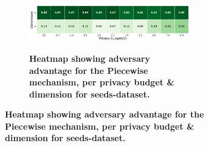 \begin{figure}[H]
\begin{subfigure}[b]{0.85\textwidth}
            \begin{subfigure}[c]{1\textwidth}
                  \caption{\textbf{Heatmap showing adversary advantage for the Piecewise mechanism, per privacy budget \& dimension for seeds-dataset.}}
                  \includegraphics[width=1\textwidth]{Results/kd-laplace/piecewise/line-dataset/shokri_mi_adv.png}
                  \label{fig:privacy_line-dataset_adversial_advantage_piecewise}
            \end{subfigure}
      \end{subfigure}
      \hfill %
      \begin{subfigure}[b]{0.075\textwidth}

\end{subfigure}
\end{figure}
